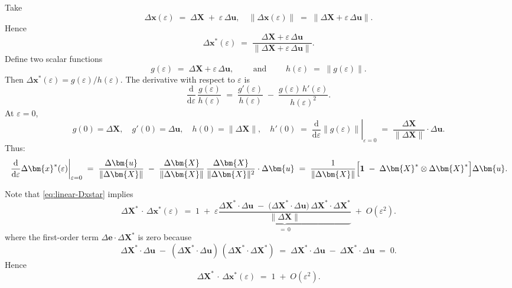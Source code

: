 \begin{marsdenbox}
\noindent
Take
\[
  \Delta \bm{x}(\varepsilon)
  \;=\;
  \Delta \bm{X}
  \;+\;
  \varepsilon\,\Delta \bm{u},
  \quad
  \|\Delta \bm{x}(\varepsilon)\|
  \;=\;
  \|\Delta \bm{X} + \varepsilon\,\Delta \bm{u}\|.
\] 
Hence \[
  \Delta \bm{x}^*(\varepsilon)
  \;=\;
  \frac{\Delta \bm{X} + \varepsilon\,\Delta \bm{u}}{\|\Delta \bm{X} + \varepsilon\,\Delta \bm{u}\|}.
\] 
Define two scalar functions \[
  g(\varepsilon) \;=\; \Delta \bm{X} + \varepsilon\,\Delta \bm{u}, 
  \qquad \text{ and }\qquad 
  h(\varepsilon) \;=\; \|g(\varepsilon)\|.
\] 
Then
\(\Delta \bm{x}^*(\varepsilon) = g(\varepsilon)/h(\varepsilon)\). 
The
derivative with respect to \(\varepsilon\) is 
\[
  \frac{\mathrm{d}}{\mathrm{d}\varepsilon}\,\frac{g(\varepsilon)}{h(\varepsilon)}
  \;=\;
  \frac{g'(\varepsilon)}{h(\varepsilon)}
  \;-\;
  \frac{g(\varepsilon)\,h'(\varepsilon)}{h(\varepsilon)^2}.
\] 
At \(\varepsilon=0\), 
\[
  g(0)=\Delta \bm{X},\quad
  g'(0)=\Delta \bm{u},
  \quad
  h(0)=\|\Delta \bm{X}\|,
  \quad
  h'(0)
  \;=\;
  \left.\frac{\mathrm{d}}{\mathrm{d}\varepsilon}\|g(\varepsilon)\|\right|_{\varepsilon=0}
  \;=\;
  \frac{\Delta \bm{X}}{\|\Delta \bm{X}\|} \cdot \Delta \bm{u}.
\] 
Thus:
\begin{equation}
\left.\frac{\mathrm{d}}{\mathrm{d}\varepsilon}\Delta \bm{x}^*(\varepsilon)\right|_{\varepsilon=0}
  \;=\;
  \frac{\Delta \bm{u}}{\|\Delta \bm{X}\|}
  \;-\;
  \frac{\Delta \bm{X}}{\|\Delta \bm{X}\|}\,
  \frac{\Delta \bm{X}}{\|\Delta \bm{X}\|^2}\cdot \Delta \bm{u}
  \;=\;
  \frac{1}{\|\Delta \bm{X}\|}
  \Bigl[
    \mathbf{1}
    \;-\;
    \Delta \bm{X}^* \otimes \Delta \bm{X}^*
  \Bigr]\Delta \bm{u}.
  \label{eq:linear-Dxstar}
\end{equation}
%
\end{marsdenbox}

Note that \eqref{eq:linear-Dxstar} implies 
\[
  \Delta \bm{X}^* \,\cdot\, \Delta \bm{x}^*(\varepsilon)
  \;=\;
  1
  \;+\;
  \varepsilon
  \underbrace{
    \frac{
      \Delta \bm{X}^*\!\cdot \Delta \bm{u}
      \;-\;
      \bigl(\Delta \bm{X}^*\!\cdot\Delta \bm{u}\bigr)\, \Delta \bm{X}^* \cdot \Delta \bm{X}^*
    }{\|\Delta \bm{X}\|}
  }_{=\,0}
  \;+\;
  O(\varepsilon^2).
\] 
where the first-order term \(\Delta \mathbf{e} \cdot \Delta \bm{X}^*\) is zero because 
\[
  \Delta \bm{X}^*\cdot \Delta \bm{u}
  \;-\;
  (\Delta \bm{X}^*\!\cdot\Delta \bm{u})\,(\Delta \bm{X}^*\!\cdot\Delta \bm{X}^*)
  \;=\;
  \Delta \bm{X}^*\!\cdot \Delta \bm{u}
  \;-\;
  \Delta \bm{X}^*\!\cdot\Delta \bm{u}
  \;=\;
  0.
\] 
Hence
\begin{equation}
  \Delta \bm{X}^* \,\cdot\, \Delta \bm{x}^*(\varepsilon)
  \;=\;
  1
  \;+\;
  O(\varepsilon^2).
  \label{eq:order-DXDx}
\end{equation}

